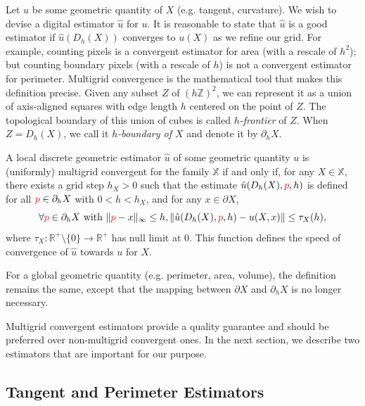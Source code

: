 \documentclass[smallextended]{svjour3}       %
\DeclarePairedDelimiter\norm{\lVert}{\rVert}%
\newcommand{\revision}[1]{\textcolor{red}{#1}}
\begin{document}
Let $u$ be some geometric quantity of $X$ (e.g. tangent, curvature). We wish to devise a digital estimator $\hat{u}$ for
$u$. It is reasonable to state that $\hat{u}$ is a good estimator if $\hat{u}(D_h(X))$ converges to $u(X)$ as we refine
our grid. For example, counting pixels is a convergent estimator for area (with a rescale of $h^2$); but counting
boundary pixels (with a rescale of $h$) is not a convergent estimator for perimeter. Multigrid convergence is the
mathematical tool that makes this definition precise. Given any subset $Z$ of $(h\mathbb{Z})^2$, we can represent it as a
union of axis-aligned squares with edge length $h$ centered on the point of $Z$. The topological boundary of this union
of cubes is called {\em $h$-frontier} of $Z$. When $Z=D_h(X)$, we call it {\em $h$-boundary of $X$} and denote it by
$\partial_h X$.

\begin{definition}
  A local discrete geometric estimator $\hat{u}$ of some geometric
  quantity $u$ is (uniformly) multigrid convergent for the family $\mathbb{X}$ if
  and only if, for any $X \in \mathbb{X}$, there exists a grid step
  $h_X>0$ such that the estimate $\hat{u}(D_h(X), \revision{p},h)$ is
  defined for all $\revision{p} \in \partial_hX$ with $ 0 < h < h_X$, and
  for any $x \in \partial X$,
  \begin{equation*}
    \forall \revision{p} \in  \partial_hX \text{ with } \norm{ \revision{p} - x }_{\infty} \leq h, \norm{ \hat{u}(D_h(X),\revision{p},h) - u(X,x)} \leq \tau_{X}(h),			
  \end{equation*}
  where $\tau_{X}:\mathbb{R}^{+}\setminus\{0\} \rightarrow
  \mathbb{R}^{+}$ has null limit at $0$. This function defines the
  speed of convergence of $\hat{u}$ towards $u$ for $X$.
\end{definition}
	
For a global geometric quantity (e.g. perimeter, area, volume), the definition remains the same, except that the mapping
between $\partial X$ and $\partial_h X$ is no longer necessary.
	
Multigrid convergent estimators provide a quality guarantee and should
be preferred over non-multigrid convergent ones. In the next section,
we describe two estimators that are important for our purpose.

\subsection{Tangent and Perimeter Estimators}
\end{document}

